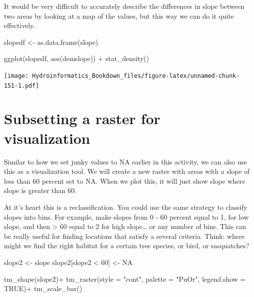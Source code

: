 \documentclass[
]{book}
\newenvironment{Shaded}{\begin{snugshade}}{\end{snugshade}}
\newcommand{\AttributeTok}[1]{\textcolor[rgb]{0.77,0.63,0.00}{#1}}
\newcommand{\ConstantTok}[1]{\textcolor[rgb]{0.00,0.00,0.00}{#1}}
\newcommand{\DecValTok}[1]{\textcolor[rgb]{0.00,0.00,0.81}{#1}}
\newcommand{\FunctionTok}[1]{\textcolor[rgb]{0.00,0.00,0.00}{#1}}
\newcommand{\NormalTok}[1]{#1}
\newcommand{\OtherTok}[1]{\textcolor[rgb]{0.56,0.35,0.01}{#1}}
\newcommand{\SpecialCharTok}[1]{\textcolor[rgb]{0.00,0.00,0.00}{#1}}
\newcommand{\StringTok}[1]{\textcolor[rgb]{0.31,0.60,0.02}{#1}}
\begin{document}
It would be very difficult to accurately describe the differences in slope between two areas by looking at a map of the values, but this way we can do it quite effectively.

\begin{Shaded}
\begin{Highlighting}[]
\NormalTok{slopedf }\OtherTok{\textless{}{-}} \FunctionTok{as.data.frame}\NormalTok{(slope)}

\FunctionTok{ggplot}\NormalTok{(slopedf, }\FunctionTok{aes}\NormalTok{(demslope)) }\SpecialCharTok{+}
  \FunctionTok{stat\_density}\NormalTok{()}
\end{Highlighting}
\end{Shaded}

\texttt{[image: Hydroinformatics\_Bookdown\_files/figure-latex/unnamed-chunk-151-1.pdf]}

\hypertarget{subsetting-a-raster-for-visualization}{%
\section{Subsetting a raster for visualization}\label{subsetting-a-raster-for-visualization}}

Similar to how we set junky values to NA earlier in this activity, we can also use this as a visualization tool. We will create a new raster with areas with a slope of less than 60 percent set to NA. When we plot this, it will just show slope where slope is greater than 60.

At it's heart this is a reclassification. You could use the same strategy to classify slopes into bins. For example, make slopes from 0 - 60 percent equal to 1, for low slope, and then \textgreater{} 60 equal to 2 for high slope\ldots{} or any number of bins. This can be really useful for finding locations that satisfy a several criteria. Think: where might we find the right habitat for a certain tree species, or bird, or sasquatches?

\begin{Shaded}
\begin{Highlighting}[]
\NormalTok{slope2 }\OtherTok{\textless{}{-}}\NormalTok{ slope}
\NormalTok{slope2[slope2 }\SpecialCharTok{\textless{}} \DecValTok{60}\NormalTok{] }\OtherTok{\textless{}{-}} \ConstantTok{NA}

\FunctionTok{tm\_shape}\NormalTok{(slope2)}\SpecialCharTok{+}
  \FunctionTok{tm\_raster}\NormalTok{(}\AttributeTok{style =} \StringTok{"cont"}\NormalTok{, }\AttributeTok{palette =} \StringTok{"PuOr"}\NormalTok{, }\AttributeTok{legend.show =} \ConstantTok{TRUE}\NormalTok{)}\SpecialCharTok{+}
  \FunctionTok{tm\_scale\_bar}\NormalTok{()}
\end{Highlighting}
\end{Shaded}
\end{document}
